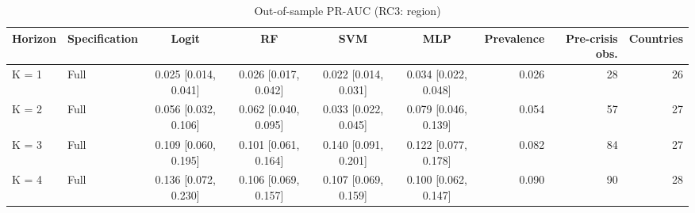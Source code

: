 \begin{table}

\caption{\label{tab:pr_boot_rc3}Out-of-sample PR-AUC (RC3: region)}
\centering
\begin{tabular}[t]{llccccrrr}
\toprule
Horizon & Specification & Logit & RF & SVM & MLP & Prevalence & Pre-crisis obs. & Countries\\
\midrule
K = 1 & Full & 0.025 [0.014, 0.041] & 0.026 [0.017, 0.042] & 0.022 [0.014, 0.031] & 0.034 [0.022, 0.048] & 0.026 & 28 & 26\\
\cmidrule{1-9}
K = 2 & Full & 0.056 [0.032, 0.106] & 0.062 [0.040, 0.095] & 0.033 [0.022, 0.045] & 0.079 [0.046, 0.139] & 0.054 & 57 & 27\\
\cmidrule{1-9}
K = 3 & Full & 0.109 [0.060, 0.195] & 0.101 [0.061, 0.164] & 0.140 [0.091, 0.201] & 0.122 [0.077, 0.178] & 0.082 & 84 & 27\\
\cmidrule{1-9}
K = 4 & Full & 0.136 [0.072, 0.230] & 0.106 [0.069, 0.157] & 0.107 [0.069, 0.159] & 0.100 [0.062, 0.147] & 0.090 & 90 & 28\\
\bottomrule
\end{tabular}
\end{table}
